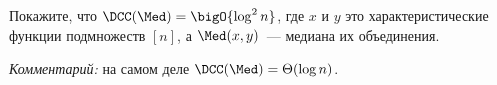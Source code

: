 Покажите, что $\DCC(\Med) = \bigO{\log^2 n}$, где $x$ и $y$ это характеристические функции подмножеств
$[n]$, а $\Med(x, y)$~--- медиана их объединения.

\textit{Комментарий:} на самом деле $\DCC(\Med) = \Theta(\log n)$.
